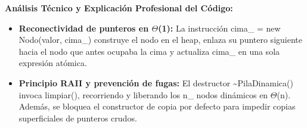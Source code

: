\documentclass[11pt,letterpaper]{article}
\begin{document}
\noindent\textbf{\color{ipnguinda}Análisis Técnico y Explicación Profesional del Código:}\par\vspace{-2pt}
\begin{itemize}
\setlength{\itemsep}{2pt}\setlength{\parskip}{0pt}
  \item \textbf{Reconectividad de punteros en $\Theta$(1): }La instrucción cima\_ = new Nodo(valor, cima\_) construye el nodo en el heap, enlaza su puntero siguiente hacia el nodo que antes ocupaba la cima y actualiza cima\_ en una sola expresión atómica.
  \item \textbf{Principio RAII y prevención de fugas: }El destructor \textasciitilde{}PilaDinamica() invoca limpiar(), recorriendo y liberando los n\_ nodos dinámicos en $\Theta$(n). Además, se bloquea el constructor de copia por defecto para impedir copias superficiales de punteros crudos.
\end{itemize}
\end{document}
